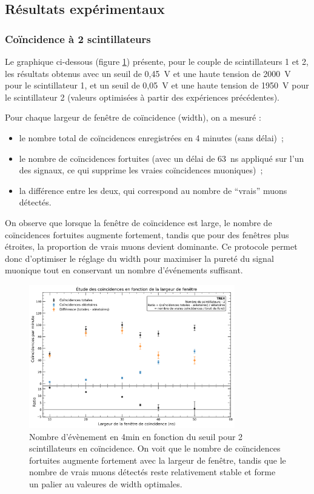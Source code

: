 \documentclass[a4paper,12pt,twoside]{article}
\begin{document}
\subsection{Résultats expérimentaux}
\subsubsection{Coïncidence à 2 scintillateurs}

Le graphique ci-dessous (figure \ref{fig:coincidences_2_scintillateurs}) présente, pour le couple de scintillateurs 1 et 2, les résultats obtenus avec un seuil de 0{,}45~V et une haute tension de 2000~V pour le scintillateur 1, et un seuil de 0{,}05~V et une haute tension de 1950~V pour le scintillateur 2 (valeurs optimisées à partir des expériences précédentes).

Pour chaque largeur de fenêtre de coïncidence (width), on a mesuré :
\begin{itemize}
    \item le nombre total de coïncidences enregistrées en 4 minutes (sans délai)~;
    \item le nombre de coïncidences fortuites (avec un délai de 63~ns appliqué sur l’un des signaux, ce qui supprime les vraies coïncidences muoniques)~;
    \item la différence entre les deux, qui correspond au nombre de “vrais” muons détectés.
\end{itemize}

On observe que lorsque la fenêtre de coïncidence est large, le nombre de coïncidences fortuites augmente fortement, tandis que pour des fenêtres plus étroites, la proportion de vrais muons devient dominante. Ce protocole permet donc d’optimiser le réglage du width pour maximiser la pureté du signal muonique tout en conservant un nombre d’événements suffisant.


\begin{figure}[!h]
    \centering
    \includegraphics[width=0.8\textwidth]{Images/Coincidences_2_Scintillateurs.png}
    \caption[Nombre d’évènement en 4 min en fonction du seuil]{Nombre d’évènement en 4min en fonction du seuil pour 2 scintillateurs en coïncidence.
    On voit que le nombre de coïncidences fortuites augmente fortement avec la largeur de fenêtre, tandis que le nombre de vrais muons détectés reste relativement stable et forme un palier au valeures de width optimales.}
    \label{fig:coincidences_2_scintillateurs}
\end{figure}
\end{document}
